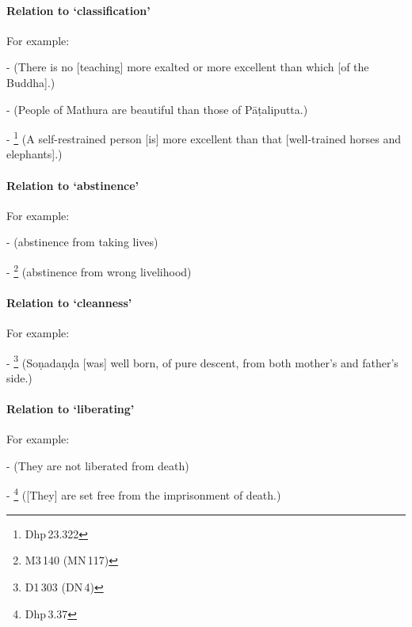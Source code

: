\paragraph*{Relation to `classification'} For example:\par
-  (There is no [teaching] more exalted or more excellent than which [of the Buddha].)\par
-  (People of Mathura are beautiful than those of P\=a\d taliputta.)\par
- \footnote{Dhp\,23.322} (A self-restrained person [is] more excellent than that [well-trained horses and elephants].)\par

\paragraph*{Relation to `abstinence'} For example:\par
-  (abstinence from taking lives)\par
- \footnote{M3\,140 (MN\,117)} (abstinence from wrong livelihood)\par

\paragraph*{Relation to `cleanness'} For example:\par
- \footnote{D1\,303 (DN\,4)} (So\d nada\d n\d da [was] well born, of pure descent, from both mother's and father's side.)\par

\paragraph*{Relation to `liberating'} For example:\par
-  (They are not liberated from death)\par
- \footnote{Dhp\,3.37} ([They] are set free from the imprisonment of death.)\par

